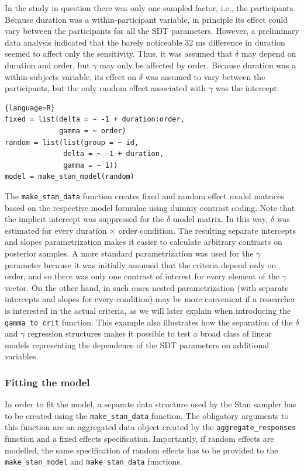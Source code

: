 \documentclass[a4paper,man,apacite,floatsintext]{apa6}
\newcommand{\code}[1]{\texttt{#1}}
\begin{document}
In the study in question there was only one sampled factor, i.e., the
participants. Because duration was a within-participant variable, in
principle its effect could vary between the participants for all the
SDT parameters. However, a preliminary data analysis indicated that
the barely noticeable 32 ms difference in duration seemed to affect
only the sensitivity. Thus, it was assumed that $\delta$ may depend on
duration and order, but $\gamma$ may only be affected by
order. Because duration was a within-subjects variable, its effect on
$\delta$ was assumed to vary between the participants, but the only
random effect associated with $\gamma$ was the intercept:

\begin{lstlisting}{language=R}
fixed = list(delta = ~ -1 + duration:order, 
             gamma = ~ order)
random = list(list(group = ~ id, 
              delta = ~ -1 + duration, 
              gamma = ~ 1))
model = make_stan_model(random)
\end{lstlisting}

The \code{make\_stan\_data} function creates fixed and random effect
model matrices based on the respective model formulae using dummy
contrast coding. Note that the implicit intercept was suppressed for
the $\delta$ model matrix. In this way, $\delta$ was estimated for
every duration $\times$ order condition. The resulting separate
intercepts and slopes parametrization makes it easier to calculate
arbitrary contrasts on posterior samples. A more standard
parametrization was used for the $\gamma$ parameter because it was
initially assumed that the criteria depend only on order, and so there
was only one contrast of interest for every element of the $\gamma$
vector. On the other hand, in such cases nested parametrization (with
separate intercepts and slopes for every condition) may be more
convenient if a researcher is interested in the actual criteria, as we
will later explain when introducing the \code{gamma\_to\_crit}
function. This example also illustrates how the separation of the
$\delta$ and $\gamma$ regression structures makes it possible to test
a broad class of linear models representing the dependence of the SDT
parameters on additional variables.

\subsubsection{Fitting the model}

In order to fit the model, a separate data structure used by the Stan
sampler has to be created using the \code{make\_stan\_data}
function. The obligatory arguments to this function are an aggregated
data object created by the \code{aggregate\_responses} function and a
fixed effects specification. Importantly, if random effects are
modelled, the same specification of random effects has to be provided
to the \code{make\_stan\_model} and \code{make\_stan\_data} functions.
\end{document}
